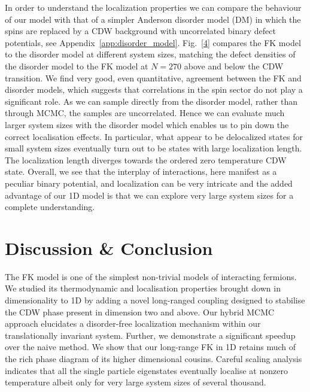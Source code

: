 In order to understand the localization properties we can compare the behaviour of our model with that of a simpler Anderson disorder model (DM) in which the spins are replaced by a {CDW} background with uncorrelated binary defect potentials, see Appendix~\protect\hyperlink{app:disorder_model}{{[}app:disorder\_model{]}}. Fig.~{[}\protect\hyperlink{fig:indiv_IPR_disorder}{4}{]} compares the FK model to the disorder model at different system sizes, matching the defect densities of the disorder model to the FK model at \(N = 270\) above and below the CDW transition. We find very good, even quantitative, agreement between the FK and disorder models, which suggests that correlations in the spin sector do not play a significant role. As we can sample directly from the disorder model, rather than through MCMC, the samples are uncorrelated. Hence we can evaluate much larger system sizes with the disorder model which enables us to pin down the correct localisation effects. In particular, what appear to be delocalized states for small system sizes eventually turn out to be states with large localization length. The localization length diverges towards the ordered zero temperature CDW state. Overall, we see that the interplay of interactions, here manifest as a peculiar binary potential, and localization can be very intricate and the added advantage of our 1D model is that we can explore very large system sizes for a complete understanding.

\hypertarget{discussion-conclusion}{%
\section{Discussion \& Conclusion}\label{discussion-conclusion}}

The {FK} model is one of the simplest non-trivial models of interacting fermions. We studied its thermodynamic and localisation properties brought down in dimensionality to 1D by adding a novel long-ranged coupling designed to stabilise the {CDW} phase present in dimension two and above. Our hybrid {MCMC} approach elucidates a disorder-free localization mechanism within our translationally invariant system. Further, we demonstrate a significant speedup over the naive method. We show that our long-range {FK} in 1D retains much of the rich phase diagram of its higher dimensional cousins. Careful scaling analysis indicates that all the single particle eigenstates eventually localise at nonzero temperature albeit only for very large system sizes of several thousand.

